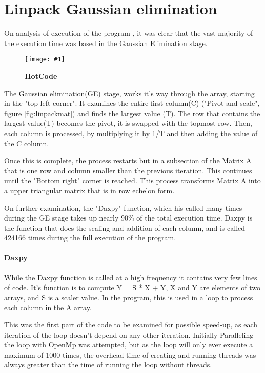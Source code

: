 \documentclass[conference]{acmsiggraph}
\newcommand{\figuremacroW}[4]{
	\begin{figure}[h] %
		\centering
		\texttt{[image: \#1]}
		\caption[#2]{\textbf{#2} - #3}
		\label{fig:#1}
	\end{figure}
}
\begin{document}
\section{Linpack Gaussian elimination}
On analysis of execution of the program , it was clear that the vast majority of the execution time was based in the Gaussian Elimination stage.

\figuremacroW
{HotCode}
{HotCode}
{}
{1.0}



The Gaussian elimination(GE) stage, works it's way through the array, starting in the "top left corner".
It examines the entire first column(C) ("Pivot and scale", figure \ref{fig:linpackmat}) and finds the largest value (T).
The row that contains the largest value(T) becomes the pivot, it is swapped with the topmost row.
Then, each column is processed, by multiplying it by 1/T and then adding the value of the C column.

Once this is complete, the process restarts but in a subsection of the Matrix A that is one row and column smaller than the previous iteration.
This continues until the "Bottom right" corner is reached. This process transforms Matrix A into a upper triangular matrix that is in row echelon form.

On further examination, the "Daxpy" function, which his called many times during the GE stage takes up nearly 90\% of the total execution time.
Daxpy is the function that does the scaling and addition of each column, and is called 424166 times during the full execution of the program.

\paragraph{Daxpy}
While the Daxpy function is called at a high frequency it contains very few lines of code.
It's function is to compute Y = S * X + Y, X and Y are elements of two arrays, and S is a scaler value.
In the program, this is used in a loop to process each column in the A array.

This was the first part of the code to be examined for possible speed-up, as each iteration of the loop doesn't depend on any other iteration.
Initially Paralleling the loop with OpenMp was attempted, but as the loop will only ever execute a maximum of 1000 times,
 the overhead time of creating and running threads was always greater than the time of running the loop without threads.
 
\end{document}
